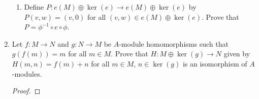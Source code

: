 \documentclass[../psets.tex]{subfiles}
\begin{document}
\begin{enumerate}
\begin{enumerate}
        \item Define $P:e(M)\oplus\ker(e)\to e(M)\oplus\ker(e)$ by $P(v,w)=(v,0)$ for all $(v,w)\in e(M)\oplus\ker(e)$. Prove that $P=\phi^{-1}\circ e\circ\phi$.
    \end{enumerate}
    \item Let $f:M\to N$ and $g:N\to M$ be $A$-module homomorphisms such that $g(f(m))=m$ for all $m\in M$. Prove that $H:M\oplus\ker(g)\to N$ given by $H(m,n)=f(m)+n$ for all $m\in M$, $n\in\ker(g)$ is an isomorphism of $A$-modules.
    \begin{proof}

\end{proof}
\end{enumerate}
\end{document}
